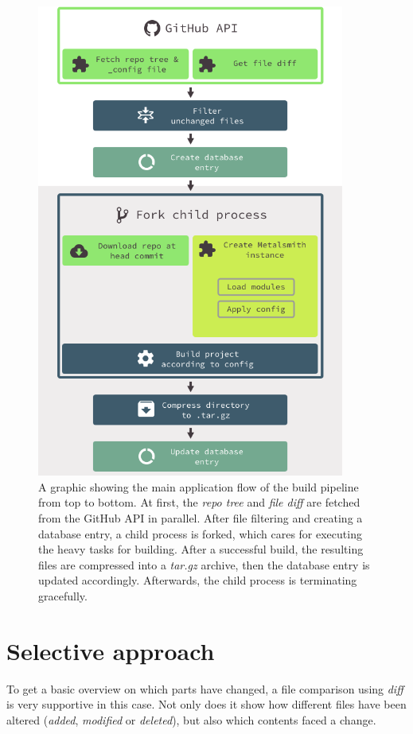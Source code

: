 \documentclass[a4paper,english,11pt]{report}
\begin{document}
%
\begin{figure}
    \centering
    \includegraphics[width=0.9\textwidth]{application_flow.png}
    \caption{A graphic showing the main application flow of the build pipeline from top to bottom. At first, the \emph{repo tree} and \emph{file diff} are fetched from the GitHub API in parallel. After file filtering and creating a database entry, a child process is forked, which cares for executing the heavy tasks for building. After a successful build, the resulting files are compressed into a \emph{tar.gz} archive, then the database entry is updated accordingly. Afterwards, the child process is terminating gracefully.}
    \label{fig:application_flow}
\end{figure}
%

\section{Selective approach}
To get a basic overview on which parts have changed, a file comparison using \emph{diff} is very supportive in this case. Not only does it show how different files have been altered (\emph{added}, \emph{modified} or \emph{deleted}), but also which contents faced a change.
\end{document}
